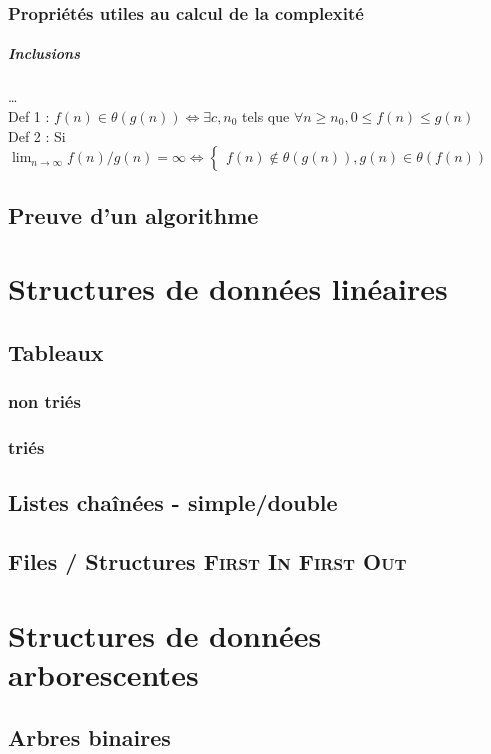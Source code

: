 \documentclass{report}
\begin{document}
\subsection{Propriétés utiles au calcul de la complexité}
\paragraph{Inclusions}\ldots\\
Def 1 : $f(n) \in \theta(g(n)) \Leftrightarrow \exists c, n_0$ tels que $\forall n \geq n_0, 0 \leq f(n) \leq g(n)$\\
Def 2 : Si $\lim_{n \to \infty} f(n)/g(n) = \infty
\Leftrightarrow
\begin{cases}
    f(n) \notin \theta(g(n)), g(n) \in \theta(f(n)) 
\end{cases}
$
\section{Preuve d'un algorithme}

\chapter{Structures de données linéaires}
\section{Tableaux}
\subsection{non triés}
\subsection{triés}
\section{Listes chaînées - simple/double}
\section{Files / Structures \textsc{First In First Out}}

\chapter{Structures de données arborescentes}
\section{Arbres binaires}
\end{document}
